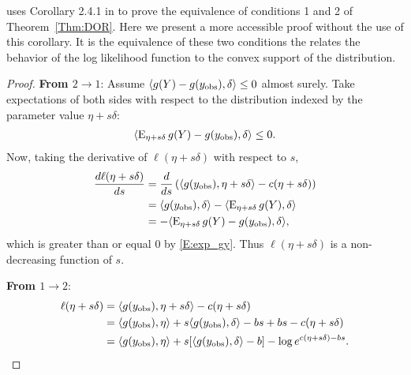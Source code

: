 \citeauthor{Geyer:gdor} uses Corollary 2.4.1 in \citet{Geyer:1990} to prove the 
equivalence of conditions 1 and 2 of Theorem~\ref{Thm:DOR}.  Here we present
a more accessible proof without the use of this corollary.  It is the equivalence
of these two conditions the relates the behavior of the log likelihood function
to the convex support of the distribution.
\begin{proof}
\textbf{From $2 \to 1$}:
Assume $\langle g(Y)-g(y_{\text{obs}}), \delta \rangle \leq 0$ almost surely.  Take expectations of both sides
with respect to the distribution indexed by the parameter value $\eta + s \delta$:
\begin{align} \label{E:exp_gy}
\langle  \operatorname{E}_{\eta + s \delta} g(Y) - g(y_{\text{obs}}), \delta \rangle \leq 0.
\end{align}
Now, taking the derivative of $\ell( \eta + s\delta)$ with respect to $s$,
\begin{align*}
\frac{d \ell( \eta + s \delta)}{d s} &= \frac{d }{d s} 
			\left ( \langle g(y_{\text{obs}}), \eta+s \delta \rangle - c(\eta+s\delta)  \right )\\
	&= \langle g(y_{\text{obs}}), \delta \rangle - \langle  \operatorname{E}_{\eta+s\delta}g(Y),\delta  \rangle\\
	&= - \langle  \operatorname{E}_{\eta+s\delta}g(Y) - g(y_{\text{obs}}),\delta  \rangle,
\end{align*}
which is greater than or equal 0 by \eqref{E:exp_gy}.
Thus $\ell(\eta+s\delta)$ is a non-decreasing function of $s$.

\textbf{From $1 \to 2$}:
\begin{align}
	\ell( \eta+s\delta) &= \langle g(y_{\text{obs}}), \eta+s\delta \rangle - c(\eta+s\delta) \notag \\ 
	&= \langle g(y_{\text{obs}}), \eta \rangle + s \langle g(y_{\text{obs}}),\delta \rangle -bs +bs - c(\eta+s\delta) \notag \\ 
	&= \langle g(y_{\text{obs}}), \eta \rangle + s [\langle g(y_{\text{obs}}),\delta \rangle -b]  - \log e^{c(\eta+s\delta) -bs}. \label{E:expanded ell}
\end{align}


\end{proof}
